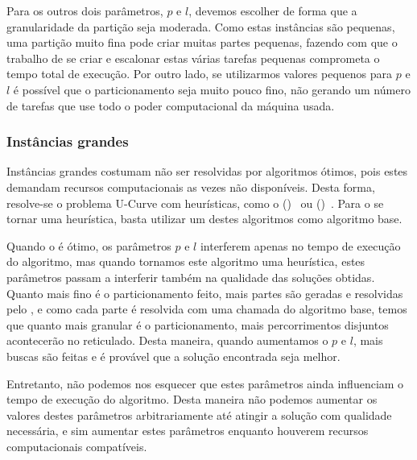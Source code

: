 Para os outros dois parâmetros, $p$ e $l$, devemos escolher de forma
que a granularidade da partição seja moderada. Como estas instâncias 
são pequenas, uma partição muito fina pode criar muitas partes pequenas,
fazendo com que o trabalho de se criar e escalonar estas várias tarefas 
pequenas comprometa o tempo total de execução. Por outro lado, se 
utilizarmos valores pequenos para $p$ e $l$ é possível que o 
particionamento seja muito pouco fino, não gerando um número de tarefas
que use todo o poder computacional da máquina usada.



\subsubsection{Instâncias grandes}
Instâncias grandes costumam não ser resolvidas por algoritmos ótimos, 
pois estes demandam recursos computacionais as vezes não disponíveis. 
Desta forma, resolve-se o problema U-Curve com heurísticas, como o 
()~\cite{PNK94} ou  
()~\cite{KJ97}. Para o  se tornar uma 
heurística, basta utilizar um destes algoritmos como algoritmo base.

Quando o  é ótimo, os parâmetros $p$ e $l$ interferem 
apenas no tempo de execução do algoritmo, mas quando tornamos este 
algoritmo uma heurística, estes parâmetros passam a interferir também
na qualidade das soluções obtidas. Quanto mais fino é o particionamento
feito, mais partes são geradas e resolvidas pelo , e como
cada parte é resolvida com uma chamada do algoritmo base, temos que 
quanto mais granular é o particionamento, mais percorrimentos 
disjuntos acontecerão no reticulado. Desta maneira, quando 
aumentamos o $p$ e $l$, mais buscas são feitas e é provável que a 
solução encontrada seja melhor.

Entretanto, não podemos nos esquecer que estes parâmetros ainda 
influenciam o tempo de execução do algoritmo. Desta maneira não podemos
aumentar os valores destes parâmetros arbitrariamente até atingir a 
solução com qualidade necessária, e sim aumentar estes parâmetros 
enquanto houverem recursos computacionais compatíveis.
